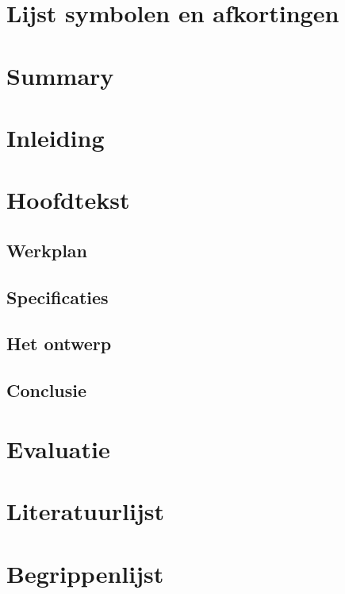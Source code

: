 \documentclass[a4paper,11pt, twoside]{article}
\begin{document}
	

	\tableofcontents
	\newpage

	\section{Lijst symbolen en afkortingen}

    \section{Summary}
    
    \section{Inleiding}
    
    
    \section{Hoofdtekst}
    
    \subsection{Werkplan}
    
    \subsection{Specificaties}
    
    \subsection{Het ontwerp}
    
    \subsection{Conclusie}
    
    \section{Evaluatie}
    
    \section{Literatuurlijst}
    
    \newpage
    \appendix
    \section{Begrippenlijst}
\end{document}
